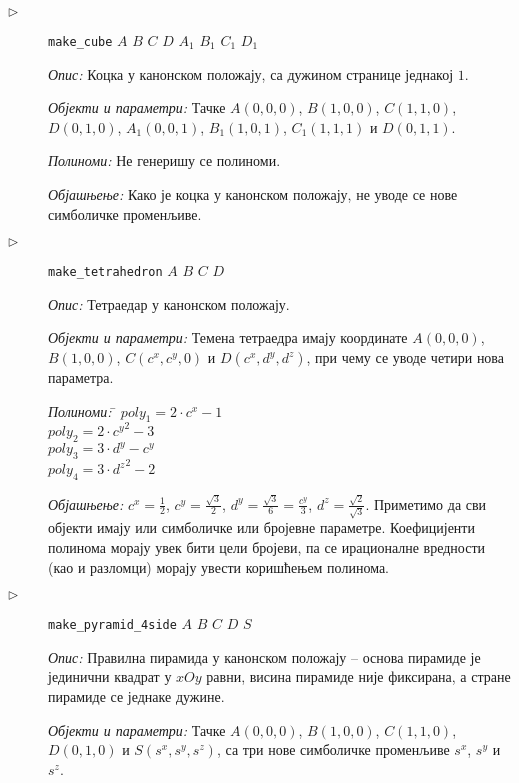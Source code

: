 \begin{description}
\item[$\triangleright$] {\tt make\_cube} $A$ $B$ $C$ $D$ $A_1$ $B_1$ $C_1$ $D_1$

  {\em Опис:} Коцка у канонском положају, са дужином странице једнакој
  $1$.

  {\em Објекти и параметри:} Тачке $A(0, 0, 0)$, $B(1, 0, 0)$, $C(1,
  1, 0)$, $D(0, 1, 0)$, $A_1(0, 0, 1)$, $B_1(1, 0, 1)$, $C_1(1, 1, 1)$
  и $D(0, 1, 1)$.

  {\em Полиноми:} Не генеришу се полиноми. 

  {\em Објашњење:} Како је коцка у канонском положају, не уводе се
  нове симболичке променљиве.

\item[$\triangleright$] {\tt make\_tetrahedron} $A$ $B$ $C$ $D$
\label{tetraedar_6glava}

  {\em Опис: } Тетраедар у канонском положају. 

  {\em Објекти и параметри:} Темена тетраедра имају координате $A(0,
  0, 0)$, $B(1, 0, 0)$, $C(c^x, c^y, 0)$ и $D(c^x, d^y, d^z)$, при
  чему се уводе четири нова параметра.

  \begin{tabbing}
    {\em Полиноми:} \= $poly_1 = 2\cdot c^x - 1$ \\
    \> $poly_2 = 2\cdot {c^y}^2 - 3$ \\
    \> $poly_3 = 3\cdot d^y - c^y$ \\
    \> $poly_4 = 3\cdot {d^z}^2 - 2$
  \end{tabbing}
  
  {\em Објашњење:} $c^x = \frac{1}{2}$, $c^y = \frac{\sqrt{3}}{2}$,
  $d^y = \frac{\sqrt{3}}{6} = \frac{c^y}{3}$, $d^z =
  \frac{\sqrt{2}}{\sqrt{3}}$. Приметимо да сви објекти имају или
  симболичке или бројевне параметре. Коефицијенти полинома морају увек
  бити цели бројеви, па се ирационалне вредности (као и разломци)
  морају увести коришћењем полинома.

\item[$\triangleright$] {\tt make\_pyramid\_4side} $A$ $B$ $C$ $D$ $S$

  {\em Опис:} Правилна пирамида у канонском положају -- основа
  пирамиде је јединични квадрат у $xOy$ равни, висина пирамиде није
  фиксирана, а стране пирамиде се једнаке дужине.
  
  {\em Објекти и параметри:} Тачке $A(0, 0, 0)$, $B(1, 0, 0)$, $C(1,
  1, 0)$, $D(0, 1, 0)$ и $S(s^x, s^y, s^z)$, са три нове симболичке
  променљиве $s^x$, $s^y$ и $s^z$.
  

\end{description}
